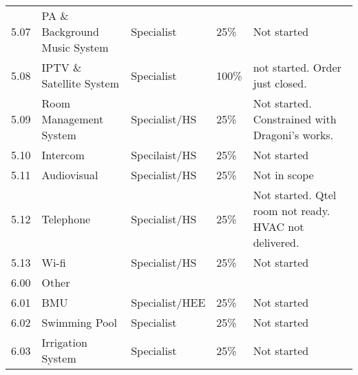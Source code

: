 \begin{longtable}{llllp{3.9cm}}
5.07	&PA \& Background Music System &Specialist&25\% & Not started\\		
5.08	&IPTV \& Satellite System	&Specialist&100\% & not started. Order just closed. \\	
5.09	&Room Management System	&Specialist/HS&25\% & Not started. Constrained with Dragoni's works.\\
5.10 &Intercom                 &Specilaist/HS&25\% & Not started\\
5.11 &Audiovisual              &Specialist/HS&25\% & Not in scope\\
5.12 &Telephone                &Specialist/HS&25\% & Not started. Qtel room not ready. HVAC not delivered.\\
5.13 &Wi-fi                    &Specialist/HS&25\% & Not started\\
\midrule
6.00 &Other                    &			&\\
6.01 & BMU                     &Specialist/HEE &25\% & Not started\\
6.02 & Swimming Pool           &Specialist     &25\% & Not started\\
6.03 &Irrigation System        &Specialist     &25\% & Not started\\
\bottomrule
\end{longtable}
\egroup
